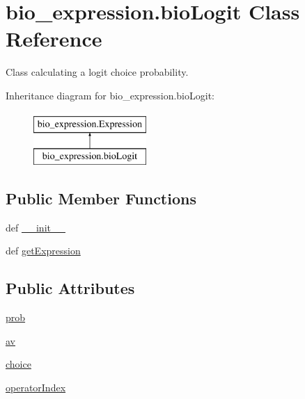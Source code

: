 \hypertarget{classbio__expression_1_1bio_logit}{\section{bio\+\_\+expression.\+bio\+Logit Class Reference}
\label{classbio__expression_1_1bio_logit}
}


Class calculating a logit choice probability.  


Inheritance diagram for bio\+\_\+expression.\+bio\+Logit\+:\begin{figure}[H]
\begin{center}
\leavevmode
\includegraphics[height=2.000000cm]{d3/d3a/classbio__expression_1_1bio_logit}
\end{center}
\end{figure}
\subsection*{Public Member Functions}
\begin{DoxyCompactItemize}
\item 
def \hyperlink{classbio__expression_1_1bio_logit_a422967247c3edec608963efabebba9df}{\+\_\+\+\_\+init\+\_\+\+\_\+}
\item 
def \hyperlink{classbio__expression_1_1bio_logit_a5bcb08158d8f097b53faf65c7715bd18}{get\+Expression}
\end{DoxyCompactItemize}
\subsection*{Public Attributes}
\begin{DoxyCompactItemize}
\item 
\hyperlink{classbio__expression_1_1bio_logit_ad5fd23e6737a77f2b75ef3efea466a93}{prob}
\item 
\hyperlink{classbio__expression_1_1bio_logit_acf8d45c3bf980e2070c2003cf906f305}{av}
\item 
\hyperlink{classbio__expression_1_1bio_logit_a8ab839cd1684c1d3171dc28018fa9fc6}{choice}
\item 
\hyperlink{classbio__expression_1_1bio_logit_a08e2231bfabc66c1a35cb3a932d2fc45}{operator\+Index}
\end{DoxyCompactItemize}


